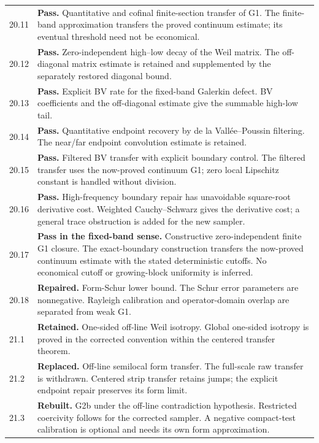 \documentclass[11pt]{article}
\theoremstyle{remark}
\begin{document}
\begin{longtable}{@{}p{}p{}@{}}
20.11 & \textbf{Pass.} Quantitative and cofinal finite-section transfer of G1. The finite-band approximation transfers the proved continuum estimate; its eventual threshold need not be economical. \\[4pt]
20.12 & \textbf{Pass.} Zero-independent high--low decay of the Weil matrix. The off-diagonal matrix estimate is retained and supplemented by the separately restored diagonal bound. \\[4pt]
20.13 & \textbf{Pass.} Explicit BV rate for the fixed-band Galerkin defect. BV coefficients and the off-diagonal estimate give the summable high-low tail. \\[4pt]
20.14 & \textbf{Pass.} Quantitative endpoint recovery by de la Vall\'ee--Poussin filtering. The near/far endpoint convolution estimate is retained. \\[4pt]
20.15 & \textbf{Pass.} Filtered BV transfer with explicit boundary control. The filtered transfer uses the now-proved continuum G1; zero local Lipschitz constant is handled without division. \\[4pt]
20.16 & \textbf{Pass.} High-frequency boundary repair has unavoidable square-root derivative cost. Weighted Cauchy--Schwarz gives the derivative cost; a general trace obstruction is added for the new sampler. \\[4pt]
20.17 & \textbf{Pass in the fixed-band sense.} Constructive zero-independent finite G1 closure. The exact-boundary construction transfers the now-proved continuum estimate with the stated deterministic cutoffs. No economical cutoff or growing-block uniformity is inferred. \\[4pt]
20.18 & \textbf{Repaired.} Form-Schur lower bound. The Schur error parameters are nonnegative. Rayleigh calibration and operator-domain overlap are separated from weak G1. \\[4pt]
21.1 & \textbf{Retained.} One-sided off-line Weil isotropy. Global one-sided isotropy is proved in the corrected convention within the centered transfer theorem. \\[4pt]
21.2 & \textbf{Replaced.} Off-line semilocal form transfer. The full-scale raw transfer is withdrawn. Centered strip transfer retains jumps; the explicit endpoint repair preserves its form limit. \\[4pt]
21.3 & \textbf{Rebuilt.} G2b under the off-line contradiction hypothesis. Restricted coercivity follows for the corrected sampler. A negative compact-test calibration is optional and needs its own form approximation. \\[4pt]

\end{longtable}
\end{document}
